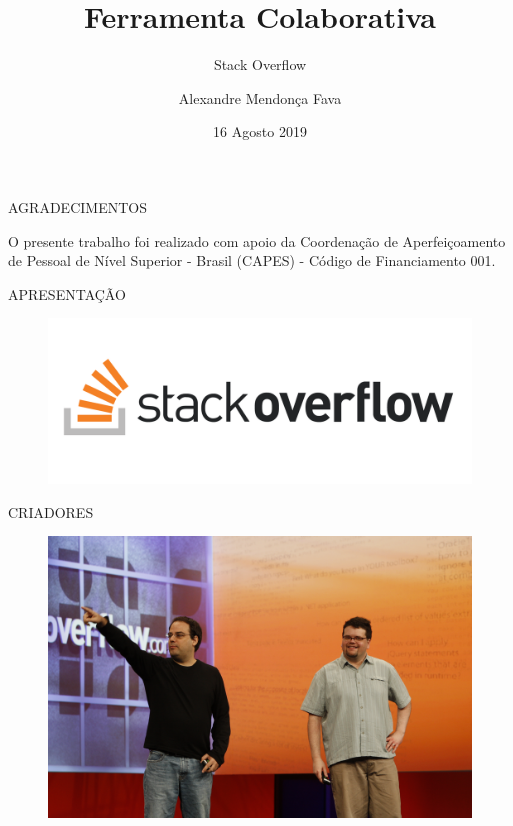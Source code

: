 \documentclass{Alexandre}
\title{Ferramenta Colaborativa}
\subtitle{Stack Overflow}
\author{Alexandre Mendonça Fava\inst{1}}
\institute[UDESC]{
  \newline \newline \newline
  \inst{1}
  Mestrado Acadêmico em Computação Aplicada - PPGCA
}
\date{16 Agosto 2019}
\begin{document}
\begin{frame}
  \titlepage
\end{frame}


\begin{frame}{AGRADECIMENTOS}

    O presente trabalho foi realizado com apoio da Coordenação de Aperfeiçoamento de Pessoal de Nível Superior - Brasil (CAPES) - Código de Financiamento 001. 

\end{frame}


\begin{frame}{APRESENTAÇÃO}

    \begin{figure}
        \includegraphics[scale = 0.2]{Figuras/Logo-StackOverflow.png}
    \end{figure}

\end{frame}


\begin{frame}{CRIADORES}

    \begin{figure}
        \includegraphics[scale = 0.06]{Figuras/Criadores-StackOverflow.jpg}
    \end{figure}

\end{frame}
\end{document}
